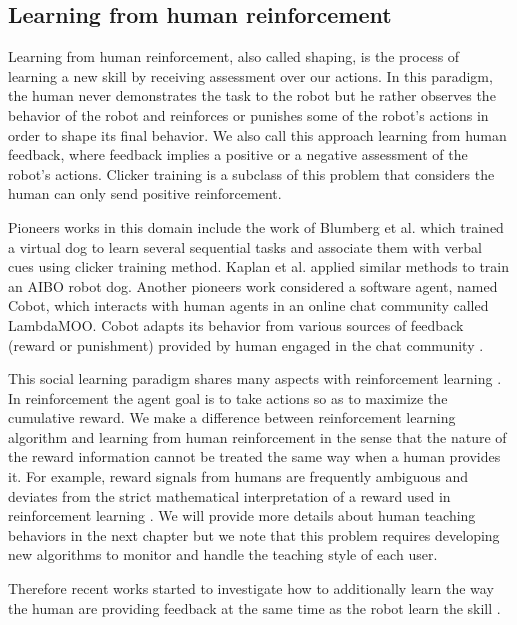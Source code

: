 \subsection{Learning from human reinforcement}

Learning from human reinforcement, also called shaping, is the process of learning a new skill by receiving assessment over our actions. In this paradigm, the human never demonstrates the task to the robot but he rather observes the behavior of the robot and reinforces or punishes some of the robot's actions in order to shape its final behavior. We also call this approach learning from human feedback, where feedback implies a positive or a negative assessment of the robot's actions. Clicker training is a subclass of this problem that considers the human can only send positive reinforcement.

Pioneers works in this domain include the work of Blumberg et al. \cite{blumberg2002integrated} which trained a virtual dog to learn several sequential tasks and associate them with verbal cues using clicker training method. Kaplan et al. \cite{kaplan2002robotic} applied similar methods to train an AIBO robot dog. Another pioneers work considered a software agent, named Cobot, which interacts with human agents in an online chat community called LambdaMOO. Cobot adapts its behavior from various sources of feedback (reward or punishment) provided by human engaged in the chat community \cite{isbell2001social}.

This social learning paradigm shares many aspects with reinforcement learning \cite{sutton1998reinforcement}. In reinforcement the agent goal is to take actions so as to maximize the cumulative reward. We make a difference between reinforcement learning algorithm and learning from human reinforcement in the sense that the nature of the reward information cannot be treated the same way when a human provides it. For example, reward signals from humans are frequently ambiguous and deviates from the strict mathematical interpretation of a reward used in reinforcement learning \cite{thomaz2008teachable,Cakmak2010optimality}. We will provide more details about human teaching behaviors in the next chapter but we note that this problem requires developing new algorithms to monitor and handle the teaching style of each user.

Therefore recent works started to investigate how to additionally learn the way the human are providing feedback at the same time as the robot learn the skill \cite{knox2009interactively}. 

